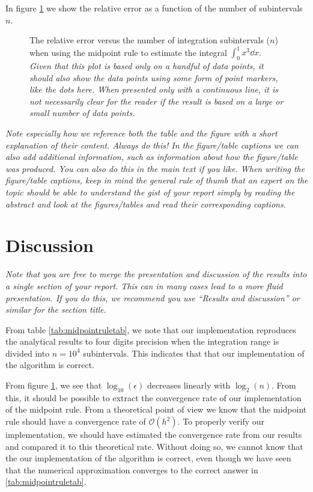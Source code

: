 \documentclass[english,notitlepage,reprint,nofootinbib]{revtex4-1}  %
\begin{document}
In figure \ref{fig:rel_err} we show the relative error as a function of the number of subintervals $n$.
\begin{figure}[h!]
    \centering %
    \caption{The relative error versus the number of integration subintervals ($n$) when using the midpoint rule to estimate the integral $\int_0^1 x^3\dd x$. \textit{Given that this plot is based only on a handful of data points, it should also show the data points using some form of point markers, like the dots here. When presented only with a continuous line, it is not necessarily clear for the reader if the result is based on a large or small number of data points.}}
    \label{fig:rel_err}
\end{figure}

\textit{Note especially how we reference both the table and the figure with a short explanation of their content. Always do this! In the figure/table captions we can also add additional information, such as information about how the figure/table was produced. You can also do this in the main text if you like. When writing the figure/table captions, keep in mind the general rule of thumb that an expert on the topic should be able to understand the gist of your report simply by reading the abstract and look at the figures/tables and read their corresponding captions.}


\section{Discussion}\label{sec:discussion}
%
\textit{Note that you are free to merge the presentation and discussion of the results into a single section of your report. This can in many cases lead to a more fluid presentation. If you do this, we recommend you use ``Results and discussion'' or similar for the section title.}

From table \ref{tab:midpointruletab}, we note that our implementation reproduces the analytical results to four digits precision when the integration range is divided into $n = 10^4$ subintervals. This indicates that that our implementation of the algorithm is correct.

From figure \ref{fig:rel_err}, we see that $\log_{10}(\epsilon)$ decreases linearly with $\log_{2}(n)$. From this, it should be possible to extract the convergence rate of our implementation of the midpoint rule. From a theoretical point of view we know that the midpoint rule should have a convergence rate of $\mathcal{O}(h^2)$. To properly verify our implementation, we should have estimated the convergence rate from our results and compared it to this theoretical rate. Without doing so, we cannot know that the our implementation of the algorithm is correct, even though we have seen that the numerical approximation converges to the correct answer in \ref{tab:midpointruletab}.
\end{document}
